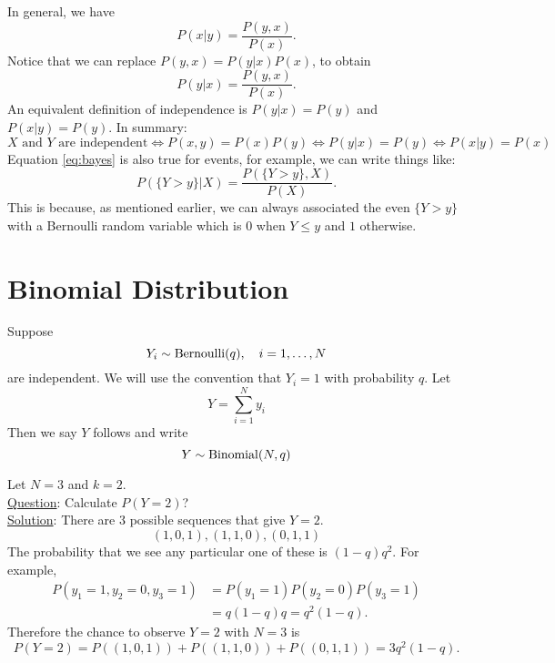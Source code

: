  In general, we have 
\begin{equation}
P(x|y) = \frac{P(y,x)}{P(x)}.
\end{equation}
Notice that we can replace $P(y,x) = P(y|x)P(x)$, to obtain 
\begin{equation}\label{eq:bayes}
P(y|x) = \frac{P(y,x)}{P(x)}.
\end{equation}
An equivalent definition of independence is $P(y|x)  = P(y)$ and $P(x|y) = P(y)$.  In summary: 
\begin{equation*}
\text{$X$ and $Y$ are independent} \iff P(x,y) = P(x)P(y) \iff P(y|x) = P(y) \iff P(x|y) = P(x)
\end{equation*}
Equation \eqref{eq:bayes} is also true for events, for example, we can write things like: 
\begin{equation}\label{eq:bayes}
P(\{Y>y\}|X) = \frac{P(\{Y>y\},X)}{P(X)}.
\end{equation}
This is because, as mentioned earlier, we can always associated the even $\{Y>y\}$ with a Bernoulli random variable which is $0$ when $Y \le y$ and $1$ otherwise. 



  \section{Binomial Distribution}
 Suppose 
  \begin{equation*}
  Y_i \sim {\rm Bernoulli}(q),\quad i =1,\dots, N
  \end{equation*} 
  are independent. We will use the convention that $Y_i=1$ with probability $q$. Let
\begin{equation*}
Y = \sum_{i=1}^N y_i
\end{equation*}
 Then we say $Y$ follows  and write
\begin{equation*}
Y \sim {\rm Binomial}(N,q)
\end{equation*}

 
 
 \begin{example}
Let $N=3$ and $k=2$. \\

\noindent
\underline{Question}: Calculate $P(Y=2)$?\\

\noindent
\underline{Solution}: There are 3 possible sequences that give $Y=2$. 
\begin{equation*}
(1,0,1),(1,1,0),(0,1,1)
\end{equation*}
The probability that we see any particular one of these is $(1-q)q^2$. For example, 
\begin{align*}
P(y_1 = 1,y_2 = 0,y_3 = 1) &= P(y_1 = 1)P(y_2=0)P(y_3 =1) \\
&= q(1-q)q = q^2(1-q).
\end{align*}
Therefore the chance to observe $Y=2$ with $N=3$ is
\begin{equation*}
P(Y=2) = P((1,0,1)) +P((1,1,0))  + P((0,1,1))  =  3q^2(1-q). 
\end{equation*}


 \end{example}
 
